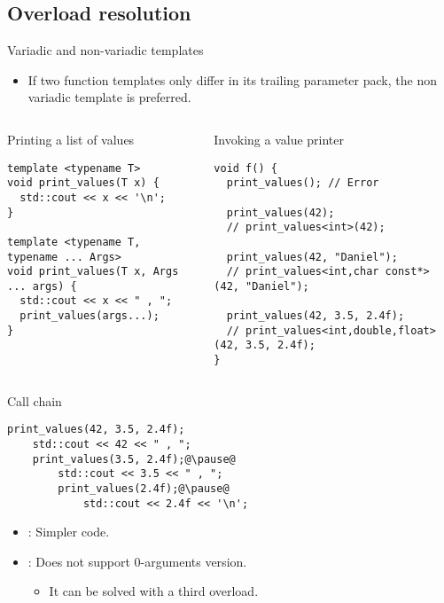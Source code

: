 \subsection{Overload resolution}

\begin{frame}[t,fragile]{Variadic and non-variadic templates}
  \begin{itemize}
    \item If two function templates only differ in its trailing
          parameter pack, the non variadic template is preferred.
  \end{itemize}

\begin{columns}[T]

\begin{block}{Printing a list of values}
\begin{lstlisting}
template <typename T>
void print_values(T x) {
  std::cout << x << '\n';
}

template <typename T, typename ... Args>
void print_values(T x, Args ... args) {
  std::cout << x << " , ";
  print_values(args...);
}
\end{lstlisting}
\end{block}

\begin{block}{Invoking a value printer}
\begin{lstlisting}
void f() {
  print_values(); // Error

  print_values(42);
  // print_values<int>(42);

  print_values(42, "Daniel");
  // print_values<int,char const*>(42, "Daniel");

  print_values(42, 3.5, 2.4f);
  // print_values<int,double,float>(42, 3.5, 2.4f);
}
\end{lstlisting}
\end{block}

\end{columns}
\end{frame}

\begin{frame}[t,fragile]{Call chain}
\begin{lstlisting}[escapechar=@]
print_values(42, 3.5, 2.4f);
    std::cout << 42 << " , ";
    print_values(3.5, 2.4f);@\pause@
        std::cout << 3.5 << " , ";
        print_values(2.4f);@\pause@
            std::cout << 2.4f << '\n';
\end{lstlisting}

\begin{itemize}
  \item {}: Simpler code.

  \item {}: Does not support 0-arguments version.
    \begin{itemize}
      \item It can be solved with a third overload.
    \end{itemize}
\end{itemize}
\end{frame}

